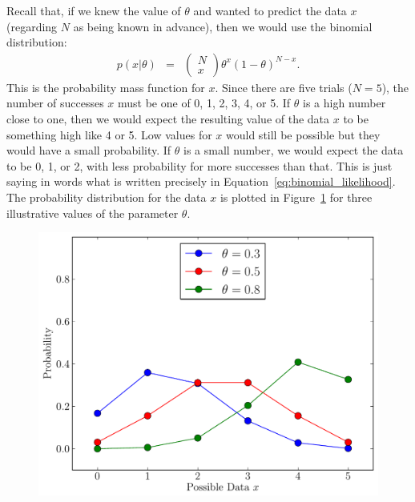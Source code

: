Recall that, if we knew the
value of $\theta$ and wanted to predict the data $x$ (regarding $N$ as being
known in advance), then we would use the binomial distribution:
\begin{eqnarray}
p(x|\theta) &=& \left(\begin{array}{c}N \\ x\end{array}\right)
\theta^x\left(1-\theta\right)^{N - x}.\label{eq:binomial_likelihood}
\end{eqnarray}
This is the probability mass function for $x$. Since there are five trials
($N=5$), the number of successes $x$ must be one of 0, 1, 2, 3, 4, or 5.
If $\theta$ is a high number close to one, then we would expect the resulting
value of the data $x$ to be something high like 4 or 5. Low values for $x$ would
still be possible but they would have a small probability. If $\theta$ is a
small number, we would expect the data to be 0, 1, or 2, with less probability
for more successes than that. This is just saying in words what is written
precisely in Equation~\ref{eq:binomial_likelihood}. The probability distribution
for the data $x$ is plotted in Figure~\ref{fig:binomial} for three illustrative
values of the parameter $\theta$.
\begin{figure}[h!]
\begin{center}
\includegraphics[scale=0.6]{Figures/binomial.pdf}
\caption{\label{fig:binomial}}
\end{center}
\end{figure}


